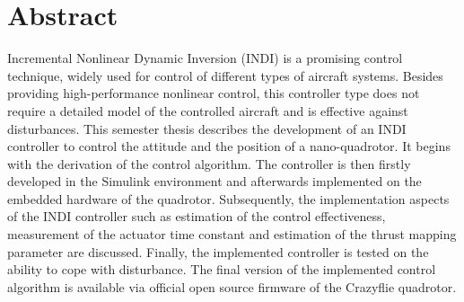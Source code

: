 \documentclass[11pt, a4paper, twoside]{report}
\begin{document}
{\let\clearpage\relax\section*{Abstract}}
\begin{itshape}
Incremental Nonlinear Dynamic Inversion (INDI) is a promising control technique, widely used for control of different types of aircraft systems. Besides providing high-performance nonlinear control, this controller type does not require a detailed model of the controlled aircraft and is effective against disturbances. This semester thesis describes the development of an INDI controller to control the attitude and the position of a nano-quadrotor. It begins with the derivation of the control algorithm. The controller is then firstly developed in the Simulink environment and afterwards implemented on the embedded hardware of the quadrotor.  Subsequently, the implementation aspects of the INDI controller such as estimation of the control effectiveness, measurement of the actuator time constant and estimation of the thrust mapping parameter are discussed. Finally, the implemented controller is tested on the ability to cope with disturbance. The final version of the implemented control algorithm is available via official open source firmware of the Crazyflie quadrotor.
\end{itshape}

\thispagestyle{fancy_beginning}
\renewcommand{\chaptermark}[1]{\markboth{#1}{}}
\chaptermark{Abstract}

\newpage\null\thispagestyle{empty}\newpage



\setlength{\cftbeforechapskip}{0.2cm}			%
\renewcommand\cftchapafterpnum{\vskip-0.4cm}	%
\renewcommand\cftsecafterpnum{\vskip-0.4cm}		%
\renewcommand\cftsubsecafterpnum{\vskip-0.4cm}	%
\renewcommand{\cftchapfont}{\normalfont}		%
 
\renewcommand*\contentsname{Table of Contents}  %
\tableofcontents								%
\end{document}
